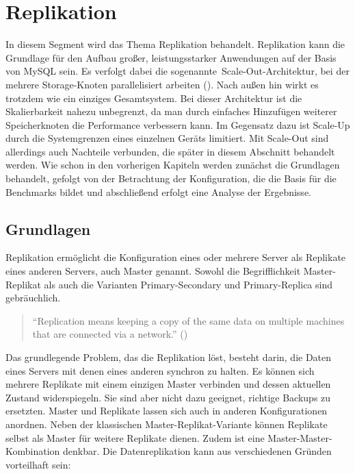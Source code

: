 
\chapter{Replikation}\label{ch:replikation}
In diesem Segment wird das Thema Replikation behandelt.
Replikation kann die Grundlage für den Aufbau großer, leistungsstarker Anwendungen auf der Basis von MySQL sein.
Es verfolgt dabei die sogenannte~\glqq Scale-Out\grqq-Architektur, bei der mehrere Storage-Knoten parallelisiert arbeiten (\cite{scale_out_eigenschaften}).
Nach außen hin wirkt es trotzdem wie ein einziges Gesamtsystem.
Bei dieser Architektur ist die Skalierbarkeit nahezu unbegrenzt, da man durch einfaches Hinzufügen weiterer Speicherknoten die Performance verbessern kann.
Im Gegensatz dazu ist Scale-Up durch die Systemgrenzen eines einzelnen Geräts limitiert.
Mit Scale-Out sind allerdings auch Nachteile verbunden, die später in diesem Abschnitt behandelt werden.
Wie schon in den vorherigen Kapiteln werden zunächst die Grundlagen behandelt, gefolgt von der Betrachtung der Konfiguration, die die Basis für die Benchmarks bildet und abschließend erfolgt eine Analyse der Ergebnisse.

\section{Grundlagen}\label{sec:replication-grundlagen}
Replikation ermöglicht die Konfiguration eines oder mehrere Server als Replikate eines anderen Servers, auch Master genannt.
Sowohl die Begrifflichkeit Master-Replikat als auch die Varianten Primary-Secondary und Primary-Replica sind gebräuchlich.

\begin{quote}
  \enquote{Replication means keeping a copy of the same data on multiple machines that are connected via a network.} (\cite[S. 151]{kleppmann2017designing})
\end{quote}

Das grundlegende Problem, das die Replikation löst, besteht darin, die Daten eines Servers mit denen eines anderen synchron zu halten.
Es können sich mehrere Replikate mit einem einzigen Master verbinden und dessen aktuellen Zustand widerspiegeln.
Sie sind aber nicht dazu geeignet, richtige Backups zu ersetzten.
Master und Replikate lassen sich auch in anderen Konfigurationen anordnen.
Neben der klassischen Master-Replikat-Variante können Replikate selbst als Master für weitere Replikate dienen.
Zudem ist eine Master-Master-Kombination denkbar.
Die Datenreplikation kann aus verschiedenen Gründen vorteilhaft sein:

